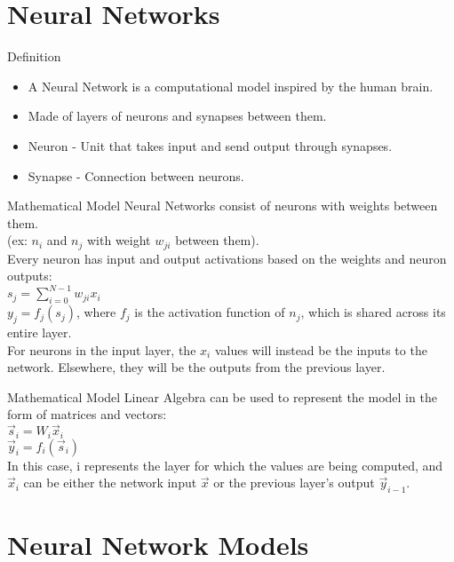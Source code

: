 \documentclass[11pt]{beamer}
\begin{document}
\section{Neural Networks}

\begin{frame}{Definition}
\begin{itemize}
    \item A Neural Network is a computational model inspired by the human brain.
    \item Made of layers of neurons and synapses between them.
    \item Neuron - Unit that takes input and send output through synapses.
    \item Synapse - Connection between neurons.
\end{itemize}
\end{frame}

\begin{frame}{Mathematical Model}
Neural Networks consist of neurons with weights between them. \\
(ex: $n_i$ and $n_j$ with weight $w_{ji}$ between them). \\
Every neuron has input and output activations based on the weights and neuron outputs: \\
$s_j = \sum_{i = 0}^{N - 1} w_{ji}x_i$ \\
$y_j = f_j(s_j)$, where $f_j$ is the activation function of $n_j$, which is shared across its entire layer. \\
For neurons in the input layer, the $x_i$ values will instead be the inputs to the network. Elsewhere, they will be the outputs from the previous layer.
\end{frame}

\begin{frame}{Mathematical Model}
Linear Algebra can be used to represent the model in the form of matrices and vectors: \\
$\vec{s}_i = W_i \vec{x}_i$ \\
$\vec{y}_i = f_i(\vec{s}_i)$ \\
In this case, i represents the layer for which the values are being computed, and $\vec{x}_i$ can be either the network input $\vec{x}$ or the previous layer's output $\vec{y}_{i-1}$.
\end{frame}

\section{Neural Network Models}
\end{document}
